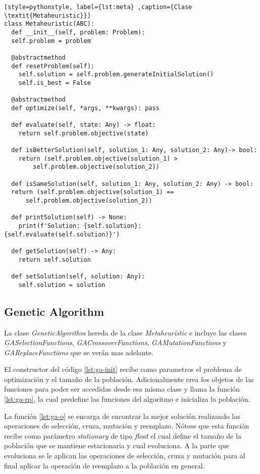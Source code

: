 \begin{lstlisting}[style=pythonstyle, label={lst:meta} ,caption={Clase \textit{Metaheuristic}}]
class Metaheuristic(ABC):
  def __init__(self, problem: Problem):
  self.problem = problem

  @abstractmethod
  def resetProblem(self):
    self.solution = self.problem.generateInitialSolution()
    self.is_best = False

  @abstractmethod
  def optimize(self, *args, **kwargs): pass

  def evaluate(self, state: Any) -> float:
    return self.problem.objective(state)

  def isBetterSolution(self, solution_1: Any, solution_2: Any)-> bool:
    return (self.problem.objective(solution_1) > 
    	self.problem.objective(solution_2)) 

  def isSameSolution(self, solution_1: Any, solution_2: Any) -> bool:
  return (self.problem.objective(solution_1) ==
  	  self.problem.objective(solution_2)) 

  def printSolution(self) -> None:
    print(f'Solution: {self.solution}: {self.evaluate(self.solution)}')

  def getSolution(self) -> Any:
    return self.solution

  def setSolution(self, solution: Any):
    self.solution = solution
\end{lstlisting}

\subsection{Genetic Algorithm}

La clase \textit{GeneticAlgorithm} hereda de la clase \textit{Metaheuristic} e incluye las clases \textit{GASelectionFunctions}, \textit{GACrossoverFunctions}, \textit{GAMutationFunctions} y \textit{GAReplaceFunctions} que se verán mas adelante.

El constructor del código \ref{lst:ga-init} recibe como parametros el problema de optimización y el tamaño de la población. Adicionalmente crea los objetos de las funciones para poder ser accedidas desde esa misma clase y llama la función \ref{lst:ga-rp}, la cual predefine las funciones del algoritmo e inicializa la población.

La función \ref{lst:ga-o} se encarga de encontrar la mejor solución realizando las operaciones de selección, cruza, mutación y reemplazo. Nótese que esta función recibe como parámetro \textit{stationary} de tipo \textit{float} el cual define el tamaño de la población que se mantiene estacionaria y cual evoluciona. A la parte que evoluciona se le aplican las operaciones de selección, cruza y mutación para al final aplicar la operación de reemplazo a la población en general.

